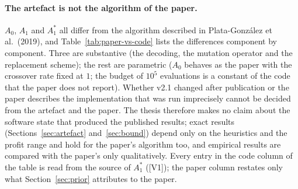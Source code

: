 \documentclass[a4paper,11pt]{article}
\newcommand{\Azero}{A_{0}}
\newcommand{\Aone}{A_{1}}
\newcommand{\Astar}{A_{1}^{*}}
\newcommand{\evid}[1]{\textcolor{inkSoft}{\scriptsize[#1]}}
\theoremstyle{plain}
\theoremstyle{definition}
\theoremstyle{remark}
\begin{document}
\paragraph{The artefact is not the algorithm of the paper.} $\Azero$, $\Aone$ and $\Astar$ all
differ from the algorithm described in Plata-Gonz\'alez et al.\ (2019), and
Table~\ref{tab:paper-vs-code} lists the differences component by component. Three are
substantive (the decoding, the mutation operator and the replacement scheme); the rest are
parametric ($\Azero$ behaves as the paper with the crossover rate fixed at $1$; the budget of
$10^{5}$ evaluations is a constant of the code that the paper does not report). Whether v2.1
changed after publication or the paper describes the implementation that was run imprecisely
cannot be decided from the artefact and the paper. The thesis therefore makes no claim about
the software state that produced the published results; exact results
(Sections~\ref{sec:artefact} and~\ref{sec:bound}) depend only on the heuristics and the
profit range and hold for the paper's algorithm too, and empirical results are compared with
the paper's only qualitatively. Every entry in the code column of the table is read from the
source of $\Astar$ (\evid{V1}); the paper column restates only what
Section~\ref{sec:prior} attributes to the paper.
\end{document}
